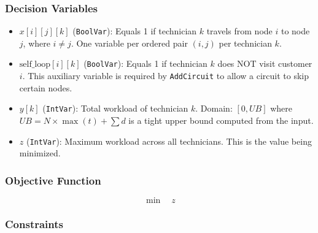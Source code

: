 \documentclass[11pt]{article}
\begin{document}
\subsubsection{Decision Variables}
\begin{itemize}
    \item $x[i][j][k]$ (\texttt{BoolVar}): Equals 1 if technician $k$ travels from node $i$ to node $j$, where $i \neq j$. One variable per ordered pair $(i,j)$ per technician $k$.
    \item $\text{self\_loop}[i][k]$ (\texttt{BoolVar}): Equals 1 if technician $k$ does NOT visit customer $i$. This auxiliary variable is required by \texttt{AddCircuit} to allow a circuit to skip certain nodes. 
    \item $y[k]$ (\texttt{IntVar}): Total workload of technician $k$. Domain: $[0, UB]$ where $UB = N \times \max(t) + \sum d$ is a tight upper bound computed from the input.
    \item $z$ (\texttt{IntVar}): Maximum workload across all technicians. This is the value being minimized.
\end{itemize}

\subsubsection{Objective Function}
$$\min \quad z$$

\subsubsection{Constraints}
\end{document}
